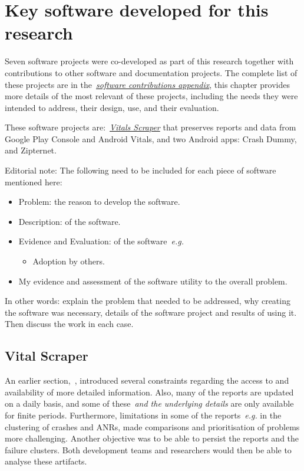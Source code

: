 \chapter{Key software developed for this research}
Seven software projects were co-developed as part of this research together with contributions to other software and documentation projects. The complete list of these projects are in the~\href{software-contributions-chapter}{\textit{software contributions appendix}}, this chapter provides more details of the most relevant of these projects, including the needs they were intended to address, their design, use, and their evaluation.

These software projects are:~\href{section-vitals-scraper}{\emph{Vitals Scraper}} that preserves reports and data from Google Play Console and Android Vitals, and two Android apps: Crash Dummy, and Zipternet.

Editorial note: The following need to be included for each piece of software mentioned here:
\begin{itemize}
    \item Problem: the reason to develop the software.
    \item Description: of the software.
    \item Evidence and Evaluation: of the software~\emph{e.g.}
    \begin{itemize}
        \item Adoption by others.
    \end{itemize}
    \item My evidence and assessment of the software utility to the overall problem.
\end{itemize}

In other words: explain the problem that needed to be addressed, why creating the software was necessary, details of the software project and results of using it. Then discuss the work in each case.

\section{Vital Scraper}\label{section-vitals-scraper}
An earlier section,~\href{section-drilling-down-into-analytics}{\emph{\MakeLowercase{}}}, %
introduced several constraints regarding the access to and availability of more detailed information. 
%
Also, many of the reports are updated on a daily basis, and some of these~\emph{and the underlying details} are only available for finite periods. Furthermore, limitations in some of the reports~\emph{e.g.} in the clustering of crashes and ANRs, made comparisons and prioritisation of problems more challenging. Another objective was to be able to persist the reports and the failure clusters. Both development teams and researchers would then be able to analyse these artifacts.

